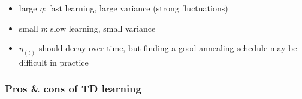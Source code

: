 \begin{frame}\frametitle{\subsubsecname}


	
\pause

	\begin{itemize}
		\item { large $\eta$: 
			fast learning, large variance (strong fluctuations)}
		\vspace{1mm}
		\item { small $\eta$: 
			slow learning, small variance}
		\vspace{1mm}
		\item { $\eta_{(t)}$ should decay over time, but finding a good annealing schedule may be difficult in practice}
	\end{itemize}

\end{frame}

\subsubsection{Pros \& cons of TD learning}

